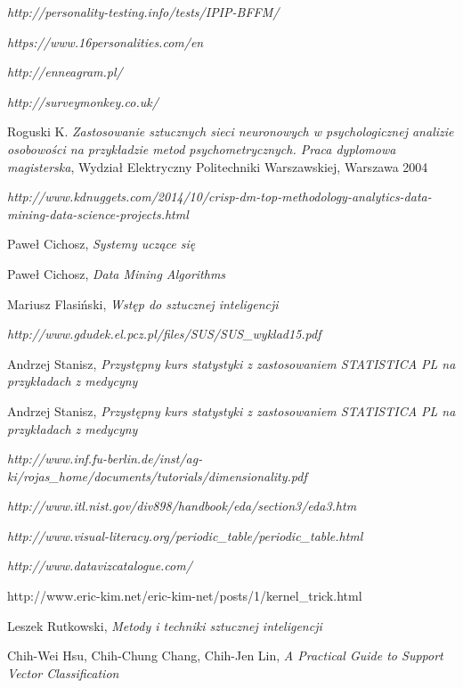 \documentclass[12pt,a4paper,oneside]{report} %
\begin{document}
\begin{thebibliography}{9}

 \emph{http://personality-testing.info/tests/IPIP-BFFM/}

 \emph{https://www.16personalities.com/en}

 \emph{http://enneagram.pl/}

 \emph{http://surveymonkey.co.uk/}

 Roguski K. \emph{Zastosowanie sztucznych sieci neuronowych w psychologicznej analizie osobowości na przykładzie metod psychometrycznych. Praca dyplomowa magisterska}, Wydział Elektryczny Politechniki Warszawskiej, Warszawa 2004

 \emph{http://www.kdnuggets.com/2014/10/crisp-dm-top-methodology-analytics-data-mining-data-science-projects.html}

 Paweł Cichosz, \emph{Systemy uczące się}

 Paweł Cichosz, \emph{Data Mining Algorithms}

 Mariusz Flasiński, \emph{Wstęp do sztucznej inteligencji}

 \emph{http://www.gdudek.el.pcz.pl/files/SUS/SUS\_wyklad15.pdf}

 Andrzej Stanisz, \emph{Przystępny kurs statystyki z zastosowaniem STATISTICA PL na przykładach z medycyny}

 Andrzej Stanisz, \emph{Przystępny kurs statystyki z zastosowaniem STATISTICA PL na przykładach z medycyny}

 \emph{http://www.inf.fu-berlin.de/inst/ag-ki/rojas\_home/documents/tutorials/dimensionality.pdf}

 \emph{http://www.itl.nist.gov/div898/handbook/eda/section3/eda3.htm}

 \emph{http://www.visual-literacy.org/periodic\_table/periodic\_table.html}

 \emph{http://www.datavizcatalogue.com/}

 http://www.eric-kim.net/eric-kim-net/posts/1/kernel\_trick.html

 Leszek Rutkowski, \emph{Metody i techniki sztucznej inteligencji}

 Chih-Wei Hsu, Chih-Chung Chang, Chih-Jen Lin, \emph{A Practical Guide to Support Vector Classification}


\end{thebibliography}
\end{document}
